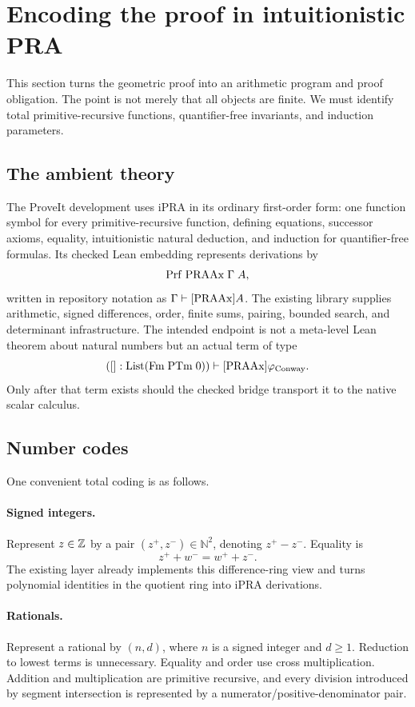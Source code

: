 \section{Encoding the proof in intuitionistic PRA}
\label{sec:ipra}

This section turns the geometric proof into an arithmetic program and proof obligation.  The point is not merely that all objects are finite.  We must identify total primitive-recursive functions, quantifier-free invariants, and induction parameters.

\subsection{The ambient theory}

The ProveIt development uses iPRA in its ordinary first-order form: one function symbol for every primitive-recursive function, defining equations, successor axioms, equality, intuitionistic natural deduction, and induction for quantifier-free formulas.  Its checked Lean embedding represents derivations by
\[
 \mathrm{Prf}\;\mathrm{PRAAx}\;\Gamma\;A,
\]
written in repository notation as \(\Gamma\vdash[\mathrm{PRAAx}]A\).  The existing  library supplies arithmetic, signed differences, order, finite sums, pairing, bounded search, and determinant infrastructure.  The intended endpoint is not a meta-level Lean theorem about natural numbers but an actual term of type
\[
 ([]:\mathrm{List}(\mathrm{Fm}\;\mathrm{PTm}\;0))
 \vdash[\mathrm{PRAAx}]\varphi_{\rm Conway}.
\]
Only after that term exists should the checked bridge  transport it to the native scalar calculus.

\subsection{Number codes}

One convenient total coding is as follows.

\paragraph{Signed integers.}
Represent \(z\in\mathbb Z\) by a pair \((z^+,z^-)\in\mathbb N^2\), denoting \(z^+-z^-\).  Equality is
\[
 z^++w^-=w^++z^-.
\]
The existing  layer already implements this difference-ring view and turns polynomial identities in the quotient ring into iPRA derivations.

\paragraph{Rationals.}
Represent a rational by \((n,d)\), where \(n\) is a signed integer and \(d\geq1\).  Reduction to lowest terms is unnecessary.  Equality and order use cross multiplication.  Addition and multiplication are primitive recursive, and every division introduced by segment intersection is represented by a numerator/positive-denominator pair.

